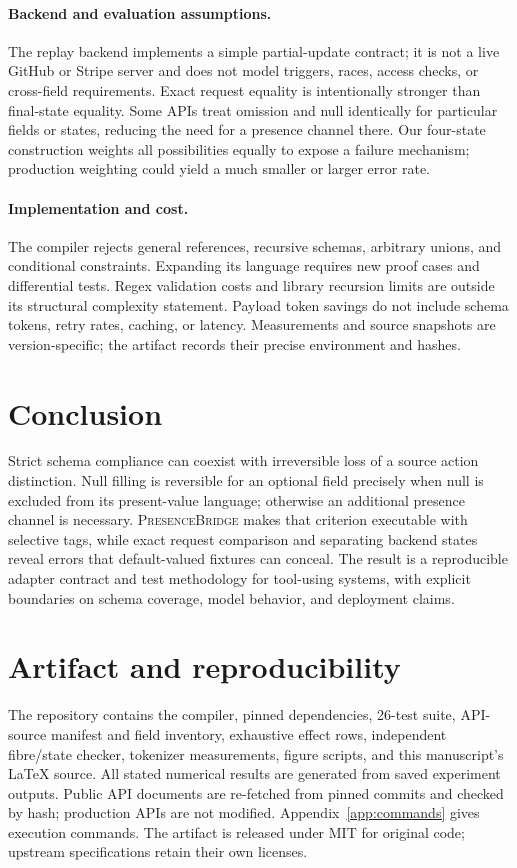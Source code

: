 \documentclass[10pt,twocolumn]{article}
\newcommand{\PB}{\textsc{PresenceBridge}}
\begin{document}
\paragraph{Backend and evaluation assumptions.}
The replay backend implements a simple partial-update contract; it is not a live GitHub or Stripe server and does not model triggers, races, access checks, or cross-field requirements. Exact request equality is intentionally stronger than final-state equality. Some APIs treat omission and null identically for particular fields or states, reducing the need for a presence channel there. Our four-state construction weights all possibilities equally to expose a failure mechanism; production weighting could yield a much smaller or larger error rate.

\paragraph{Implementation and cost.}
The compiler rejects general references, recursive schemas, arbitrary unions, and conditional constraints. Expanding its language requires new proof cases and differential tests. Regex validation costs and library recursion limits are outside its structural complexity statement. Payload token savings do not include schema tokens, retry rates, caching, or latency. Measurements and source snapshots are version-specific; the artifact records their precise environment and hashes.

\section{Conclusion}
Strict schema compliance can coexist with irreversible loss of a source action distinction. Null filling is reversible for an optional field precisely when null is excluded from its present-value language; otherwise an additional presence channel is necessary. \PB{} makes that criterion executable with selective tags, while exact request comparison and separating backend states reveal errors that default-valued fixtures can conceal. The result is a reproducible adapter contract and test methodology for tool-using systems, with explicit boundaries on schema coverage, model behavior, and deployment claims.

\section*{Artifact and reproducibility}
The repository contains the compiler, pinned dependencies, 26-test suite, API-source manifest and field inventory, exhaustive effect rows, independent fibre/state checker, tokenizer measurements, figure scripts, and this manuscript's \LaTeX{} source. All stated numerical results are generated from saved experiment outputs. Public API documents are re-fetched from pinned commits and checked by hash; production APIs are not modified. Appendix~\ref{app:commands} gives execution commands. The artifact is released under MIT for original code; upstream specifications retain their own licenses.
\end{document}
